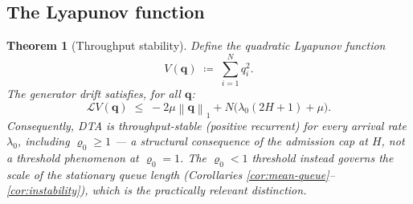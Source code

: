 \documentclass[11pt,a4paper]{report}
\newtheorem{theorem}{Theorem}[section]
\newcommand{\norm}[1]{\left\lVert #1 \right\rVert}
\newcommand{\rhozero}{\varrho_0}
\newcommand{\lambdazero}{\lambda_0}
\newcommand{\generator}{\mathcal{L}}
\begin{document}
\subsection{The Lyapunov function}

\begin{theorem}[Throughput stability]
\label{thm:lyapunov}
Define the quadratic Lyapunov function
\begin{equation}
  V(\mathbf{q}) \;\coloneqq\; \sum_{i=1}^N q_i^2.
  \label{eq:lyapunov}
\end{equation}
The generator drift satisfies, for all $\mathbf{q}$:
\begin{equation}
  \generator V(\mathbf{q})
  \;\leq\; -2\mu\norm{\mathbf{q}}_1 + N\bigl(\lambda_0(2H+1)+\mu\bigr).
  \label{eq:drift}
\end{equation}
Consequently, DTA is throughput-stable (positive recurrent) for
\emph{every} arrival rate $\lambdazero$, including $\rhozero \geq 1$ ---
a structural consequence of the admission cap at $H$, not a threshold
phenomenon at $\rhozero=1$. The $\rhozero<1$ threshold instead governs
the \emph{scale} of the stationary queue length (Corollaries
\ref{cor:mean-queue}--\ref{cor:instability}), which is the practically
relevant distinction.
\end{theorem}
\end{document}
